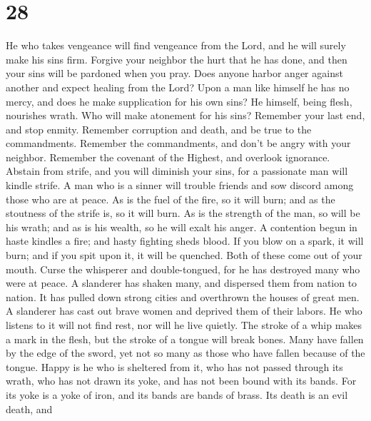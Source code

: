 \hypertarget{section-8}{%
\section{28}\label{section-8}}

 He who takes vengeance will find vengeance from the Lord,
and he will surely make his sins firm.  Forgive your
neighbor the hurt that he has done, and then your sins will be pardoned
when you pray.  Does anyone harbor anger against another and
expect healing from the Lord?  Upon a man like himself he
has no mercy, and does he make supplication for his own sins?
 He himself, being flesh, nourishes wrath. Who will make
atonement for his sins?  Remember your last end, and stop
enmity. Remember corruption and death, and be true to the commandments.
 Remember the commandments, and don't be angry with your
neighbor. Remember the covenant of the Highest, and overlook ignorance.
 Abstain from strife, and you will diminish your sins, for a
passionate man will kindle strife.  A man who is a sinner
will trouble friends and sow discord among those who are at peace.
 As is the fuel of the fire, so it will burn; and as the
stoutness of the strife is, so it will burn. As is the strength of the
man, so will be his wrath; and as is his wealth, so he will exalt his
anger.  A contention begun in haste kindles a fire; and
hasty fighting sheds blood.  If you blow on a spark, it
will burn; and if you spit upon it, it will be quenched. Both of these
come out of your mouth.  Curse the whisperer and
double-tongued, for he has destroyed many who were at peace.
 A slanderer has shaken many, and dispersed them from
nation to nation. It has pulled down strong cities and overthrown the
houses of great men.  A slanderer has cast out brave women
and deprived them of their labors.  He who listens to it
will not find rest, nor will he live quietly.  The stroke
of a whip makes a mark in the flesh, but the stroke of a tongue will
break bones.  Many have fallen by the edge of the sword,
yet not so many as those who have fallen because of the tongue.
 Happy is he who is sheltered from it, who has not passed
through its wrath, who has not drawn its yoke, and has not been bound
with its bands.  For its yoke is a yoke of iron, and its
bands are bands of brass.  Its death is an evil death, and
